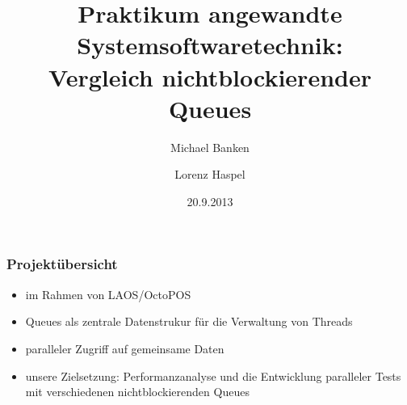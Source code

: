\documentclass[svgnames]{beamer}
\institute{Friedrich-Alexander Universit\"at Erlangen-N\"urnberg}
\title[Vergleich nichtblockierender Queues]{Praktikum angewandte Systemsoftwaretechnik: \\
Vergleich nichtblockierender Queues}
\author{Michael Banken \and Lorenz Haspel} %
\date{20.9.2013} %
\begin{document}
\begin{frame}

	\titlepage
\end{frame}

\begin{frame}
\frametitle{Projekt\"ubersicht}
\begin{itemize}
\item im Rahmen von LAOS/OctoPOS
\item Queues als zentrale Datenstrukur f\"ur die Verwaltung von Threads
\item paralleler Zugriff auf gemeinsame Daten
\item unsere Zielsetzung: Performanzanalyse und die Entwicklung
paralleler Tests mit verschiedenen nichtblockierenden Queues
\end{itemize}
\end{frame}
\end{document}
